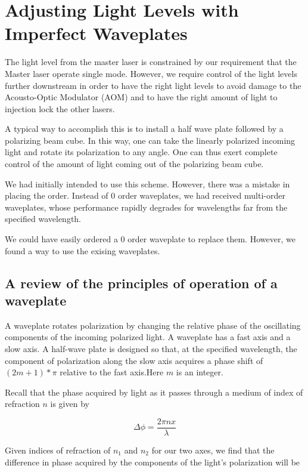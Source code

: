 \chapter{Adjusting Light Levels with Imperfect Waveplates}
\label{twoWaveplateTrick}

The light level from the master laser is constrained by our requirement that the Master laser operate single mode. However, we require control of the light levels further downstream in order to have the right light levels to avoid damage to the Acousto-Optic Modulator (AOM) and to have the right amount of light to injection lock the other lasers. 

A typical way to accomplish this is to install a half wave plate followed by a polarizing beam cube. In this way, one can take the linearly polarized incoming light and rotate its polarization to any angle. One can thus exert complete control of the amount of light coming out of the polarizing beam cube. 

We had initially intended to use this scheme. However, there was a mistake in placing the order. Instead of 0 order waveplates, we had received multi-order waveplates, whose performance rapidly degrades for wavelengths far from the specified wavelength. 

We could have easily ordered a 0 order waveplate to replace them. However, we found a way to use the exising waveplates.

\section{A review of the principles of operation of a waveplate}

A waveplate rotates polarization by changing the relative phase of the oscillating components of the incoming polarized light. A waveplate has a fast axis and a slow axis. A half-wave plate is designed so that, at the specified wavelength, the component of polarization along the slow axis acquires a phase shift of $(2m+1)*\pi$ relative to the fast axis.Here $m$ is an integer. 

Recall that the phase acquired by light as it passes through a medium of index of refraction $n$ is given by 

\begin{equation}
  \Delta \phi = \frac{2 \pi n x}{\lambda} \label{deltaPhi0}
\end{equation}

Given indices of refraction of $n_1$ and $n_2$ for our two axes, we find that the difference in phase acquired by the components of the light's polarization will be 

